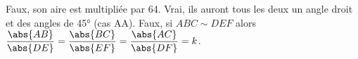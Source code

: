 %
%
    \begin{tasks}
        \task Faux, son aire est multipliée par 64.
        \task Vrai, ils auront tous les deux un angle droit et des angles de \ang{45} (cas AA).
        \task Faux, si \(ABC \sim DEF\) alors \(\dfrac{\abs{AB}}{\abs{DE}} = \dfrac{\abs{BC}}{\abs{EF}} = \dfrac{\abs{AC}}{\abs{DF}} = k\).
    \end{tasks}
